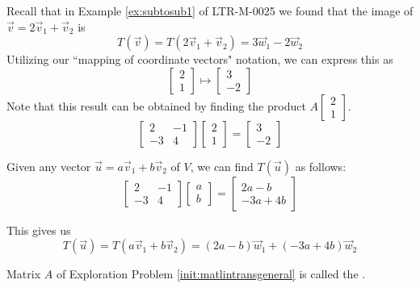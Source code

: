 \documentclass{ximera}
\begin{document}
\begin{exploration}
Recall that in Example \ref{ex:subtosub1} of LTR-M-0025 we found that the image of $\vec{v}=2\vec{v}_1+\vec{v}_2$ is $$T(\vec{v})=T(2\vec{v}_1+\vec{v}_2)=3\vec{w}_1-2\vec{w}_2$$
Utilizing our ``mapping of coordinate vectors" notation, we can express this as 
$$\begin{bmatrix}2\\1\end{bmatrix}\mapsto\begin{bmatrix}3\\-2\end{bmatrix}$$
Note that this result can be obtained by finding the product $A\begin{bmatrix}2\\1\end{bmatrix}$.
$$\begin{bmatrix}2&-1\\-3&4\end{bmatrix}\begin{bmatrix}2\\1\end{bmatrix}=\begin{bmatrix}3\\-2\end{bmatrix}$$

Given any vector $\vec{u}=a\vec{v}_1+b\vec{v}_2$ of $V$, we can find $T(\vec{u})$ as follows:
$$\begin{bmatrix}2&-1\\-3&4\end{bmatrix}\begin{bmatrix}a\\b\end{bmatrix}=\begin{bmatrix}2a-b\\-3a+4b\end{bmatrix}$$

This gives us
$$T(\vec{u})=T(a\vec{v}_1+b\vec{v}_2)=(2a-b)\vec{w}_1+(-3a+4b)\vec{w}_2$$

\end{exploration}

Matrix $A$ of Exploration Problem \ref{init:matlintransgeneral} is called the .
\end{document}
